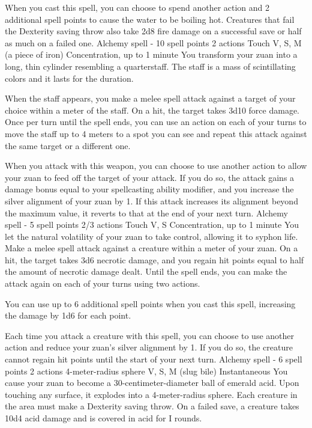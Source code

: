     When you cast this spell, you can choose to spend another action and 2 additional spell points to cause the water to be boiling hot.
    Creatures that fail the Dexterity saving throw also take 2d8 fire damage on a successful save or half as much on a failed one.
    {Alchemy spell - 10 spell points}
    {2 actions}
    {Touch}
    {V, S, M (a piece of iron)}
    {Concentration, up to 1 minute}
    You transform your zuan into a long, thin cylinder resembling a quarterstaff.
    The staff is a mass of scintillating colors and it lasts for the duration.

    When the staff appears, you make a melee spell attack against a target of your choice within a meter of the staff.
    On a hit, the target takes 3d10 force damage.
    Once per turn until the spell ends, you can use an action on each of your turns to move the staff up to 4 meters to a spot you can see and repeat this attack against the same target or a different one.

    When you attack with this weapon, you can choose to use another action to allow your zuan to feed off the target of your attack.
    If you do so, the attack gains a damage bonus equal to your spellcasting ability modifier, and you increase the silver alignment of your zuan by 1.
    If this attack increases its alignment beyond the maximum value, it reverts to that at the end of your next turn.
    {Alchemy spell - 5 spell points}
    {2/3 actions}
    {Touch}
    {V, S}
    {Concentration, up to 1 minute}
    You let the natural volatility of your zuan to take control, allowing it to syphon life.
    Make a melee spell attack against a creature within a meter of your zuan.
    On a hit, the target takes 3d6 necrotic damage, and you regain hit points equal to half the amount of necrotic damage dealt.
    Until the spell ends, you can make the attack again on each of your turns using two actions.

    You can use up to 6 additional spell points when you cast this spell, increasing the damage by 1d6 for each point.

    Each time you attack a creature with this spell, you can choose to use another action and reduce your zuan's silver alignment by 1.
    If you do so, the creature cannot regain hit points until the start of your next turn.
    {Alchemy spell - 6 spell points}
    {2 actions}
    {4-meter-radius sphere}
    {V, S, M (slug bile)}
    {Instantaneous}
    You cause your zuan to become a 30-centimeter-diameter ball of emerald acid.
    Upon touching any surface, it explodes into a 4-meter-radius sphere.
    Each creature in the area must make a Dexterity saving throw.
    On a failed save, a creature takes 10d4 acid damage and is covered in acid for I rounds.

